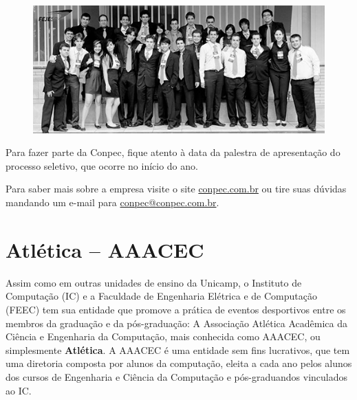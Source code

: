 \begin{figure}[H]
    \centering
    \includegraphics[scale=0.40]{img/conpec_foto.jpg}
\end{figure}

Para fazer parte da Conpec, fique atento à data da palestra de apresentação do
processo seletivo, que ocorre no início do ano.

Para saber mais sobre a empresa visite o site \url{conpec.com.br} ou
tire suas dúvidas mandando um e-mail para \url{conpec@conpec.com.br}.

\newpage
\section{Atlética -- AAACEC}

Assim como em outras unidades de ensino da Unicamp, o Instituto de Computação
(IC) e a Faculdade de Engenharia Elétrica e de Computação (FEEC) tem sua
entidade que promove a prática de eventos desportivos entre os membros da
graduação e da pós-graduação: A Associação Atlética Acadêmica da Ciência
e Engenharia da Computação, mais conhecida como AAACEC, ou simplesmente
\textbf{Atlética}. A AAACEC é uma entidade sem fins lucrativos, que tem uma
diretoria composta por alunos da computação, eleita a cada ano pelos alunos
dos cursos de Engenharia e Ciência da Computação e pós-graduandos vinculados ao IC.

